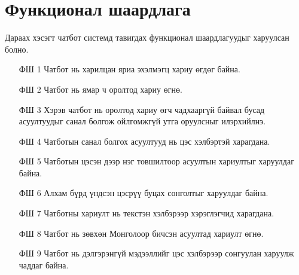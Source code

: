 \section{Функционал шаардлага}
Дараах хэсэгт чатбот системд тавигдах функционал шаардлагуудыг харуулсан болно.
\begin{itemize}
  \item[ФШ 1] Чатбот нь харилцан яриа эхэлмэгц хариу өгдөг байна. 
  \item[ФШ 2] Чатбот нь ямар ч оролтод хариу өгнө.
  \item[ФШ 3] Хэрэв чатбот нь оролтод хариу өгч чадхааргүй байвал бусад асуултуудыг санал болгож ойлгомжгүй утга оруулсныг илэрхийлнэ.
  \item[ФШ 4] Чатботын санал болгох асуултууд нь цэс хэлбэртэй харагдана.
  \item[ФШ 5] Чатботын цэсэн дээр нэг товшилтоор асуултын хариултыг харуулдаг байна.  
  \item[ФШ 6] Алхам бүрд үндсэн цэсрүү буцах сонголтыг харуулдаг байна. 
  \item[ФШ 7] Чатботны хариулт нь текстэн хэлбэрээр хэрэглэгчид харагдана.
  \item[ФШ 8] Чатбот нь зөвхөн Монголоор бичсэн асуултад хариулт өгнө.
  \item[ФШ 9] Чатбот нь дэлгэрэнгүй мэдээллийг цэс хэлбэрээр сонгуулан харуулж чаддаг байна. 
  
\end{itemize}
